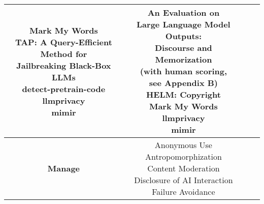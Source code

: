 \documentclass[fleqn]{article}
\begin{document}
\begin{table}[H]
\begin{tabular}{|c|c|c|c|}
{			\textbullet\hspace{3pt} Mark My Words\\ 	
			\textbullet\hspace{3pt} TAP: A Query-Efficient Method for \\\hspace{10pt}Jailbreaking Black-Box LLMs\\ 	
			\textbullet\hspace{3pt} detect-pretrain-code\\ 	
			\textbullet\hspace{3pt} llmprivacy\\ 	
			\textbullet\hspace{3pt} mimir\\ 	
		} 
		& \makecell[l]{ 	
			\textbullet\hspace{3pt} An Evaluation on\\\hspace{10pt}Large Language Model Outputs:\\\hspace{10pt}Discourse and Memorization\\\hspace{10pt}(with human scoring,\\\hspace{10pt}see Appendix B)\\ 	
			\textbullet\hspace{3pt} HELM: Copyright\\ 	
			\textbullet\hspace{3pt} Mark My Words\\ 	
			\textbullet\hspace{3pt} llmprivacy\\ 	
			\textbullet\hspace{3pt} mimir	\\ 	
		} \\ 
		\hline		
		\textbf{Manage} &
		\makecell[l]{ 	
			\textbullet\hspace{3pt} Anonymous Use\\ 	
			\textbullet\hspace{3pt} Antropomorphization\\ 	
			\textbullet\hspace{3pt} Content Moderation\\ 	
			\textbullet\hspace{3pt} Disclosure of AI Interaction\\ 	
			\textbullet\hspace{3pt} Failure Avoidance\\ 	
}
\end{tabular}
\end{table}
\end{document}
